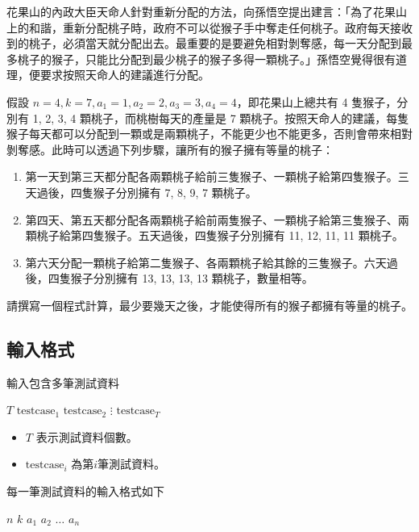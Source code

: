 花果山的內政大臣天命人針對重新分配的方法，向孫悟空提出建言：「為了花果山上的和諧，重新分配桃子時，政府不可以從猴子手中奪走任何桃子。政府每天接收到的桃子，必須當天就分配出去。最重要的是要避免相對剝奪感，每一天分配到最多桃子的猴子，只能比分配到最少桃子的猴子多得一顆桃子。」孫悟空覺得很有道理，便要求按照天命人的建議進行分配。

假設 \(n=4,k=7,a_1=1,a_2=2,a_3=3,a_4=4\)，即花果山上總共有 4
隻猴子，分別有 1, 2, 3, 4 顆桃子，而桃樹每天的產量是 7
顆桃子。按照天命人的建議，每隻猴子每天都可以分配到一顆或是兩顆桃子，不能更少也不能更多，否則會帶來相對剝奪感。此時可以透過下列步驟，讓所有的猴子擁有等量的桃子：

\begin{enumerate}
\def\labelenumi{\arabic{enumi}.}
\tightlist
\item
  第一天到第三天都分配各兩顆桃子給前三隻猴子、一顆桃子給第四隻猴子。三天過後，四隻猴子分別擁有
  7, 8, 9, 7 顆桃子。
\item
  第四天、第五天都分配各兩顆桃子給前兩隻猴子、一顆桃子給第三隻猴子、兩顆桃子給第四隻猴子。五天過後，四隻猴子分別擁有
  11, 12, 11, 11 顆桃子。
\item
  第六天分配一顆桃子給第二隻猴子、各兩顆桃子給其餘的三隻猴子。六天過後，四隻猴子分別擁有
  13, 13, 13, 13 顆桃子，數量相等。
\end{enumerate}

請撰寫一個程式計算，最少要幾天之後，才能使得所有的猴子都擁有等量的桃子。

\subsection{輸入格式}

輸入包含多筆測試資料

\begin{format}
\f{
$T$
$\text{testcase}_1$
$\text{testcase}_2$
$\vdots$
$\text{testcase}_T$
}
\end{format}

\begin{itemize}
\tightlist
\item
  \(T\) 表示測試資料個數。
\item
  \(\text{testcase}_i\) 為第\(i\)筆測試資料。
\end{itemize}

每一筆測試資料的輸入格式如下

\begin{format}
\f{
$n$ $k$
$a_1$ $a_2$ $\ldots$ $a_n$
}
\end{format}

